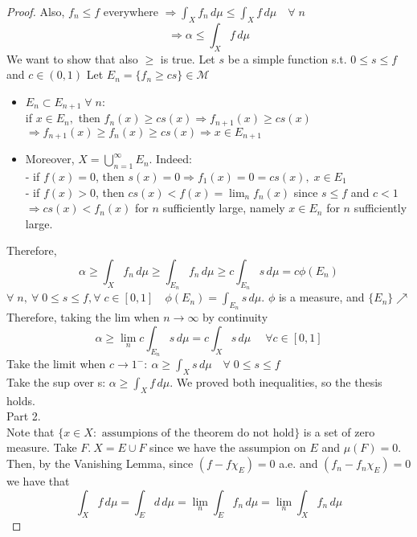 \begin{proof}
    Also, \(f_n \leq f \) everywhere \(\Rightarrow \int_X f_n \, d\mu \leq \int_X f \, d\mu \quad \forall \; n\) 
    \[
        \Rightarrow \alpha \leq \int_X f \, d\mu 
    \]
    We want to show that also \(\geq \) is true. Let \(s\) be a simple function s.t. \(0 \leq s \leq f\) and \(c \in \left(0,1\right)\)
    Let \(E_n = \{f_n \geq cs\} \in \mathcal{M}\)
    \begin{itemize}
        \item \(E_n \subset E_{n+1} \; \forall \; n:\) 
        \\ if \(x \in E_n, \) then \(f_n(x) \geq cs(x) \Rightarrow f_{n+1}(x) \geq cs(x)\) \\ \(\Rightarrow f_{n+1}(x) \geq f_n(x) \geq cs(x) \Rightarrow x \in E_{n+1}\)
        \item Moreover, \(X = \bigcup_{n=1}^\infty E_n\). Indeed: 
        \\ - if \(f(x)=0\), then \(s(x)=0 \Rightarrow f_1(x)=0 = cs(x), \; x \in E_1\) 
        \\ - if \(f(x)>0\), then \(cs(x) < f(x)=\lim_n f_n(x)\) since \(s \leq f \) and \(c <1\) 
        \\ \(\Rightarrow cs(x) < f_n(x)\) for \(n \) sufficiently large, namely \(x \in E_n \) for \(n \) sufficiently large. 
    \end{itemize} 
    Therefore, 
    \[
        \alpha \geq \int_X f_n \, d\mu \geq \int_{E_n} f_n \, d\mu \geq c \int_{E_n} s \, d\mu = c \phi(E_n)
    \]
    \(\forall \; n, \ \forall \; 0 \leq s \leq f, \forall \; c \in \left[0, 1\right]\quad \phi(E_n) = \int_{E_n} s \, d\mu\). 
    \(\phi\) is a measure, and \(\{E_n\} \nearrow\) \\
    Therefore, taking the lim when \(n \to \infty\) by continuity 
    \[
        \alpha \geq \lim_n c \int_{E_n} s \, d\mu = c \int_X s \, d\mu \; \quad \forall c \in \left[0, 1\right]
    \]
    Take the limit when \(c \to 1^-: \ \alpha \geq \int_X s \, d\mu  \quad \forall \; 0 \leq s \leq f \) \\
    Take the sup over s: \(\alpha \geq \int_X f \, d\mu \).
    We proved both inequalities, so the thesis holds. \\
    Part 2. \\
    Note that \(\{x \in X: \text{ assumpions of the theorem do not hold}\}\) is a set of zero measure. Take \(F. \ X = E \cup F \) since we have the assumpion on \(E\) and \(\mu (F)=0\). \\ 
    Then, by the Vanishing Lemma, since \((f - f \chi_E)=0\) a.e. and \((f_n - f_n \chi_E)=0\) we have that 
    \[ 
        \int_X f \, d\mu = \int_E d \, d\mu = \lim_n \int_E f_n \, d\mu = \lim_n \int_X f_n \, d\mu 
    \]
\end{proof}